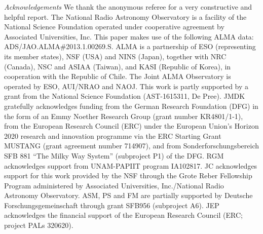\documentclass[twocolumn]{aastex61}
\begin{document}

\textit{Acknowledgements}
We thank the anonymous referee for a very constructive and helpful report.
The National Radio Astronomy Observatory is a facility of the National Science
Foundation operated under cooperative agreement by Associated Universities,
Inc.
This paper makes use of the following ALMA data: ADS/JAO.ALMA\#2013.1.00269.S.
ALMA is a partnership of ESO (representing its member states), NSF (USA) and
NINS (Japan), together with NRC (Canada), NSC and ASIAA (Taiwan), and KASI
(Republic of Korea), in cooperation with the Republic of Chile. The Joint ALMA
Observatory is operated by ESO, AUI/NRAO and NAOJ.
This work is partly supported by a grant from the National Science Foundation
(AST-1615311, De Pree).  JMDK gratefully acknowledges funding from the German
Research Foundation (DFG) in the form of an Emmy Noether Research Group (grant
number KR4801/1-1), from the European Research Council (ERC) under the European
Union's Horizon 2020 research and innovation programme via the ERC Starting
Grant MUSTANG (grant agreement number 714907), and from Sonderforschungsbereich
SFB 881 ``The Milky Way System'' (subproject P1) of the DFG.
RGM acknowledges support from UNAM-PAPIIT program IA102817.
JC acknowledges support for this work provided by the NSF through the Grote
Reber Fellowship Program administered by Associated Universities, Inc./National
Radio Astronomy Observatory.
ASM, PS and FM are partially supported by Deutsche Forschungsgemeinschaft
through grant SFB956 (subproject A6).
JEP acknowledges the financial support of the European Research Council (ERC;
project PALs 320620).





\appendix
\end{document}
